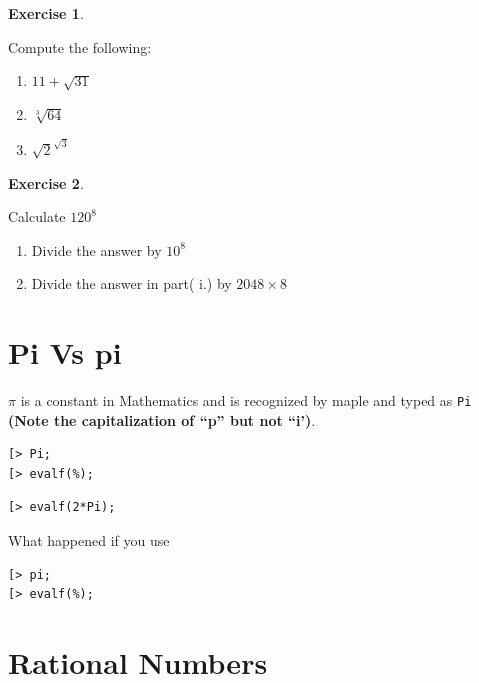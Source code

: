 \documentclass[
]{book}
\providecommand{\tightlist}{%
  \setlength{\itemsep}{0pt}\setlength{\parskip}{0pt}}
\theoremstyle{definition}
\theoremstyle{definition}
\theoremstyle{definition}
\newtheorem{exercise}{Exercise}[chapter]
\theoremstyle{definition}
\theoremstyle{remark}
\begin{document}
\begin{exercise}
\protect\hypertarget{exr:unnamed-chunk-4}{}\label{exr:unnamed-chunk-4}

Compute the following:

\begin{enumerate}
\def\labelenumi{\roman{enumi}.}
\tightlist
\item
  \(11 + \sqrt{31}\)
\item
  \(\sqrt[3]{64}\)
\item
  \(\sqrt{2}^{\sqrt{3}}\)
\end{enumerate}

\end{exercise}

\begin{exercise}
\protect\hypertarget{exr:unnamed-chunk-5}{}\label{exr:unnamed-chunk-5}

Calculate \(120^8\)

\begin{enumerate}
\def\labelenumi{\roman{enumi}.}
\tightlist
\item
  Divide the answer by \(10^8\)
\item
  Divide the answer in part( i.) by \(2048 \times 8\)
\end{enumerate}

\end{exercise}

\section{Pi Vs pi}\label{pi-vs-pi}

\(\pi\) is a constant in Mathematics and is recognized by maple and typed as \texttt{Pi} \textbf{(Note the capitalization of ``p'' but not ``i')}.

\begin{verbatim}
[> Pi;
[> evalf(%);
\end{verbatim}

\begin{verbatim}
[> evalf(2*Pi);
\end{verbatim}

What happened if you use

\begin{verbatim}
[> pi;
[> evalf(%);
\end{verbatim}

\section{Rational Numbers}\label{rational-numbers}
\end{document}
